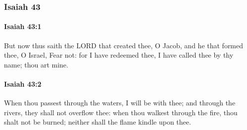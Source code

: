 	\subsubsection{Isaiah 43} %
		\label{ISAIAH-43}

		\paragraph{Isaiah 43:1} %
			\label{ISAIAH-43-1}

			But now thus saith the LORD that created thee, O Jacob, and he that formed thee, O Israel, Fear not: for I have redeemed thee, I have called thee by thy name; thou art mine.


		\paragraph{Isaiah 43:2} %
			\label{ISAIAH-43-2}

			When thou passest through the waters, I will be with thee; and through the rivers, they shall not overflow thee: when thou walkest through the fire, thou shalt not be burned; neither shall the flame kindle upon thee.

